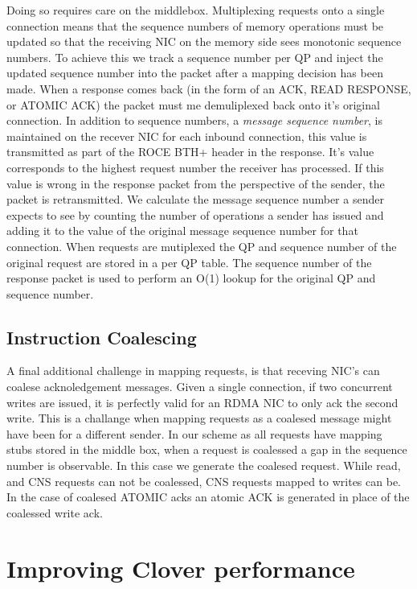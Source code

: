 Doing so requires care on the middlebox. Multiplexing requests onto a single
connection means that the sequence numbers of memory operations must be updated
so that the receiving NIC on the memory side sees monotonic sequence numbers. To
achieve this we track a sequence number per QP and inject the updated sequence
number into the packet after a mapping decision has been made. When a response
comes back (in the form of an ACK, READ RESPONSE, or ATOMIC ACK) the packet must
me demuliplexed back onto it's original connection. In addition to sequence
numbers, a \textit{message sequence number}, is maintained on the recever NIC
for each inbound connection, this value is transmitted as part of the ROCE BTH+
header in the response. It's value corresponds to the highest request number the
receiver has processed. If this value is wrong in the response packet from the
perspective of the sender, the packet is retransmitted. We calculate the message
sequence number a sender expects to see by counting the number of operations a
sender has issued and adding it to the value of the original message sequence
number for that connection. When requests are mutiplexed the QP and sequence
number of the original request are stored in a per QP table. The sequence number
of the response packet is used to perform an O(1) lookup for the original QP and
sequence number.


\subsection{Instruction Coalescing} A final additional challenge in mapping
requests, is that receving NIC's can coalese acknoledgement messages. Given a
single connection, if two concurrent writes are issued, it is perfectly valid
for an RDMA NIC to only ack the second write. This is a challange when mapping
requests as a coalesed message might have been for a different sender. In our
scheme as all requests have mapping stubs stored in the middle box, when a
request is coalessed a gap in the sequence number is observable. In this case we
generate the coalesed request. While read, and CNS requests can not be
coalessed, CNS requests mapped to writes can be. In the case of coalesed ATOMIC
acks an atomic ACK is generated in place of the coalessed write ack.



\section{Improving Clover performance}

